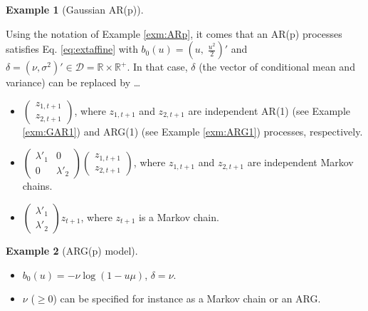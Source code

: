 \documentclass[
  12pt,
]{book}
\providecommand{\tightlist}{%
  \setlength{\itemsep}{0pt}\setlength{\parskip}{0pt}}
\theoremstyle{definition}
\theoremstyle{definition}
\newtheorem{example}{Example}[chapter]
\theoremstyle{definition}
\theoremstyle{definition}
\theoremstyle{remark}
\begin{document}
\begin{example}[Gaussian AR(p)]
\protect\hypertarget{exm:extendedARp}{}\label{exm:extendedARp}

Using the notation of Example \ref{exm:ARp}, it comes that an AR(p) processes satisfies Eq. \eqref{eq:extaffine} with \(b_0(u) = \left(u, \; \frac{u^2}{2}\right)'\) and \(\delta = (\nu,\sigma^2)' \in \mathcal{D}=\mathbb{R} \times \mathbb{R}^+\). In that case, \(\delta\) (the vector of conditional mean and variance) can be replaced by \ldots{}

\begin{itemize}
\tightlist
\item
  \(\left( \begin{array}{l} z_{1,t+1} \\ z_{2,t+1} \end{array} \right)\), where \(z_{1,t+1}\) and \(z_{2,t+1}\) are independent AR(1) (see Example \ref{exm:GAR1}) and ARG(1) (see Example \ref{exm:ARG1}) processes, respectively.
\item
  \(\left( \begin{array}{ll} \lambda'_1 & 0 \\ 0 & \lambda'_2 \end{array} \right)\)\(\left( \begin{array}{l} z_{1,t+1} \\ z_{2,t+1} \end{array} \right)\), where \(z_{1,t+1}\) and \(z_{2,t+1}\) are independent Markov chains.
\item
  \(\left( \begin{array}{l} \lambda'_1 \\ \lambda'_2 \end{array}\right)z_{t+1}\), where \(z_{t+1}\) is a Markov chain.
\end{itemize}

\end{example}

\begin{example}[ARG(p) model]
\protect\hypertarget{exm:ARGp}{}\label{exm:ARGp}\leavevmode

\begin{itemize}
\tightlist
\item
  \(b_0(u)= - \nu \log(1-u\mu)\), \(\delta=\nu\).
\item
  \(\nu\) (\(\ge 0\)) can be specified for instance as a Markov chain or an ARG.
\end{itemize}

\end{example}
\end{document}
